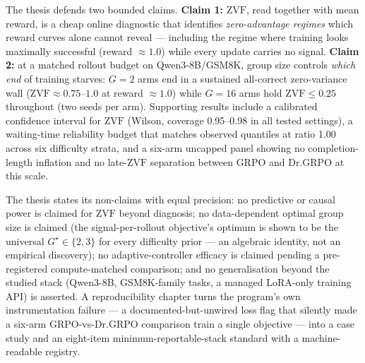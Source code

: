 \documentclass[12pt,a4paper,oneside]{report}
\newcommand{\ZVF}{\ensuremath{\mathrm{ZVF}}}
\begin{document}
The thesis defends two bounded claims. \textbf{Claim 1:} \ZVF{}, read together
with mean reward, is a cheap online diagnostic that identifies
\emph{zero-advantage regimes} which reward curves alone cannot reveal ---
including the regime where training looks maximally successful (reward
$\approx 1.0$) while every update carries no signal. \textbf{Claim 2:} at a
matched rollout budget on Qwen3-8B/GSM8K, group size controls \emph{which end}
of training starves: $G{=}2$ arms end in a sustained all-correct zero-variance
wall ($\ZVF \approx 0.75$--$1.0$ at reward $\approx 1.0$) while $G{=}16$ arms
hold $\ZVF \le 0.25$ throughout (two seeds per arm). Supporting results
include a calibrated confidence interval for \ZVF{} (Wilson, coverage
0.95--0.98 in all tested settings), a waiting-time reliability budget that
matches observed quantiles at ratio 1.00 across six difficulty strata, and a
six-arm uncapped panel showing no completion-length inflation and no late-\ZVF{}
separation between GRPO and Dr.GRPO at this scale.

The thesis states its non-claims with equal precision: no predictive or causal
power is claimed for \ZVF{} beyond diagnosis; no data-dependent optimal group
size is claimed (the signal-per-rollout objective's optimum is shown to be the
universal $G^\star \in \{2,3\}$ for every difficulty prior --- an algebraic
identity, not an empirical discovery); no adaptive-controller efficacy is
claimed pending a pre-registered compute-matched comparison; and no
generalisation beyond the studied stack (Qwen3-8B, GSM8K-family tasks, a
managed LoRA-only training API) is asserted. A reproducibility chapter turns
the program's own instrumentation failure --- a documented-but-unwired loss
flag that silently made a six-arm GRPO-vs-Dr.GRPO comparison train a single
objective --- into a case study and an eight-item minimum-reportable-stack
standard with a machine-readable registry.

\tableofcontents












\appendix


\end{document}
